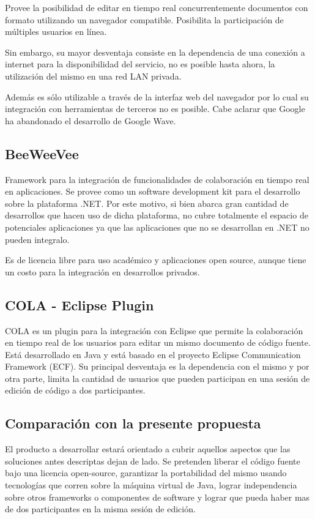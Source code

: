 \documentclass[12pt,a4paper]{article}
\begin{document}
	Provee la posibilidad de editar en tiempo real concurrentemente documentos con formato utilizando un navegador compatible. Posibilita la participación de múltiples usuarios en línea.

	Sin embargo, su mayor desventaja consiste en la dependencia de una conexión a internet para la disponibilidad del servicio, no es posible hasta ahora, la utilización del mismo en una red LAN privada.

	 Además es sólo utilizable a través de la interfaz web del navegador por lo cual su integración con herramientas de terceros no es posible. Cabe aclarar que Google ha abandonado el desarrollo de Google Wave.

	

	\subsection{BeeWeeVee \cite{beeweevee}}

	Framework para la integración de funcionalidades de colaboración en tiempo real en aplicaciones. Se provee como un software development kit para el desarrollo sobre la plataforma .NET. Por este motivo, si bien abarca gran cantidad de desarrollos que hacen uso de dicha plataforma, no cubre totalmente el espacio de potenciales aplicaciones ya que las aplicaciones que no se desarrollan en .NET no pueden integralo.

	Es de licencia libre para uso académico y aplicaciones open source, aunque tiene un costo para la integración en desarrollos privados.



	\subsection{COLA \cite{cola} - Eclipse Plugin}

	COLA es un plugin para la integración con Eclipse que permite la colaboración en tiempo real de los usuarios para editar un mismo documento de código fuente. Está desarrollado en Java y está basado en el proyecto Eclipse Communication Framework (ECF). Su principal desventaja es la dependencia con el mismo y por otra parte, limita la cantidad de usuarios que pueden participan en una sesión de edición de código a dos participantes.

	\subsection{Comparación con la presente propuesta}
El producto a desarrollar estará orientado a cubrir aquellos aspectos que las soluciones antes descriptas dejan de lado. Se pretenden liberar el código fuente bajo una licencia open-source, garantizar la portabilidad del mismo usando tecnologías que corren sobre la máquina virtual de Java, lograr independencia sobre otros frameworks o componentes de software y lograr que pueda haber mas de dos participantes en la misma sesión de edición.
\end{document}
